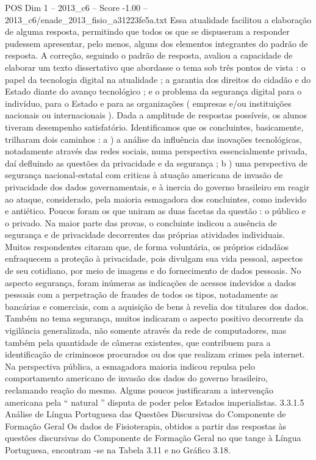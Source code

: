 \begin{textsample}{POS Dim 1 – 2013\_c6 – Score -1.00 – 2013\_c6/enade\_2013\_fisio\_a31223fe5a.txt}
Essa atualidade facilitou a elaboração de alguma resposta, permitindo que todos os que se dispuseram a responder pudessem apresentar, pelo menos, alguns dos elementos integrantes do padrão de resposta.
A correção, seguindo o padrão de resposta, avaliou a capacidade de elaborar um texto dissertativo que abordasse o tema sob três pontos de vista : o papel da tecnologia digital na atualidade ; a garantia dos direitos do cidadão e do Estado diante do avanço tecnológico ; e o problema da segurança digital para o indivíduo, para o Estado e para as organizações ( empresas e/ou instituições nacionais ou internacionais ).
Dada a amplitude de respostas possíveis, os alunos tiveram desempenho satisfatório.
Identificamos que os concluintes, basicamente, trilharam dois caminhos : a ) a análise da influência das inovações tecnológicas, notadamente através das redes sociais, numa perspectiva essencialmente privada, daí defluindo as questões da privacidade e da segurança ; b ) uma perspectiva de segurança nacional-estatal com criticas à atuação americana de invasão de privacidade dos dados governamentais, e à inercia do governo brasileiro em reagir ao ataque, considerado, pela maioria esmagadora dos concluintes, como indevido e antiético.
Poucos foram os que uniram as duas facetas da questão : o público e o privado.
Na maior parte das provas, o concluinte indicou a ausência de segurança e de privacidade decorrentes das próprias atividades individuais.
Muitos respondentes citaram que, de forma voluntária, os próprios cidadãos enfraquecem a proteção à privacidade, pois divulgam sua vida pessoal, aspectos de seu cotidiano, por meio de imagens e do fornecimento de dados pessoais.
No aspecto segurança, foram inúmeras as indicações de acessos indevidos a dados pessoais com a perpetração de fraudes de todos os tipos, notadamente as bancárias e comerciais, com a aquisição de bens à revelia dos titulares dos dados.
Também no tema segurança, muitos indicaram o aspecto positivo decorrente da vigilância generalizada, não somente através da rede de computadores, mas também pela quantidade de câmeras existentes, que contribuem para a identificação de criminosos procurados ou dos que realizam crimes pela internet.
Na perspectiva pública, a esmagadora maioria indicou repulsa pelo comportamento americano de invasão dos dados do governo brasileiro, reclamando reação do mesmo.
Alguns poucos justificaram a intervenção americana pela “ natural ” disputa de poder pelos Estados imperialistas. 3.3.1.5 Análise de Língua Portuguesa das Questões Discursivas do Componente de Formação Geral Os dados de Fisioterapia, obtidos a partir das respostas às questões discursivas do Componente de Formação Geral no que tange à Língua Portuguesa, encontram -se na Tabela 3.11 e no Gráfico 3.18.

\end{textsample}
